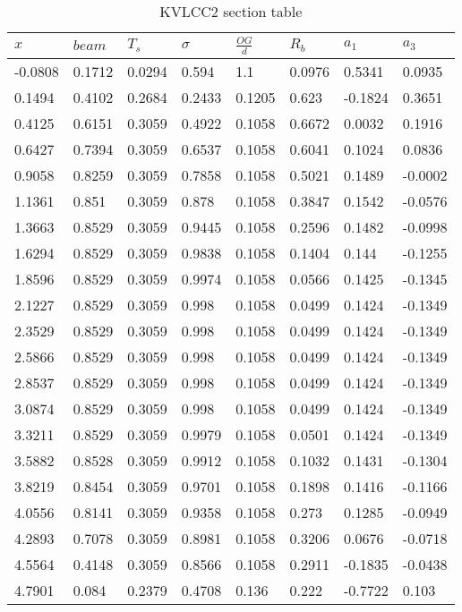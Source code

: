     
\begin{table}[H]
\small
\center
\caption{KVLCC2 section table}
\label{tab:kvlcc2_section_table}
\begin{tabular}{llllllll}
\toprule\addlinespace$x$ & $beam$ & $T_s$ & $\sigma$ & $\frac{OG}{d}$ & $R_b$ & $a_1$ & $a_3$\\ 
\midrule-0.0808 & 0.1712 & 0.0294 & 0.594 & 1.1 & 0.0976 & 0.5341 & 0.0935\\ 
0.1494 & 0.4102 & 0.2684 & 0.2433 & 0.1205 & 0.623 & -0.1824 & 0.3651\\ 
0.4125 & 0.6151 & 0.3059 & 0.4922 & 0.1058 & 0.6672 & 0.0032 & 0.1916\\ 
0.6427 & 0.7394 & 0.3059 & 0.6537 & 0.1058 & 0.6041 & 0.1024 & 0.0836\\ 
0.9058 & 0.8259 & 0.3059 & 0.7858 & 0.1058 & 0.5021 & 0.1489 & -0.0002\\ 
1.1361 & 0.851 & 0.3059 & 0.878 & 0.1058 & 0.3847 & 0.1542 & -0.0576\\ 
1.3663 & 0.8529 & 0.3059 & 0.9445 & 0.1058 & 0.2596 & 0.1482 & -0.0998\\ 
1.6294 & 0.8529 & 0.3059 & 0.9838 & 0.1058 & 0.1404 & 0.144 & -0.1255\\ 
1.8596 & 0.8529 & 0.3059 & 0.9974 & 0.1058 & 0.0566 & 0.1425 & -0.1345\\ 
2.1227 & 0.8529 & 0.3059 & 0.998 & 0.1058 & 0.0499 & 0.1424 & -0.1349\\ 
2.3529 & 0.8529 & 0.3059 & 0.998 & 0.1058 & 0.0499 & 0.1424 & -0.1349\\ 
2.5866 & 0.8529 & 0.3059 & 0.998 & 0.1058 & 0.0499 & 0.1424 & -0.1349\\ 
2.8537 & 0.8529 & 0.3059 & 0.998 & 0.1058 & 0.0499 & 0.1424 & -0.1349\\ 
3.0874 & 0.8529 & 0.3059 & 0.998 & 0.1058 & 0.0499 & 0.1424 & -0.1349\\ 
3.3211 & 0.8529 & 0.3059 & 0.9979 & 0.1058 & 0.0501 & 0.1424 & -0.1349\\ 
3.5882 & 0.8528 & 0.3059 & 0.9912 & 0.1058 & 0.1032 & 0.1431 & -0.1304\\ 
3.8219 & 0.8454 & 0.3059 & 0.9701 & 0.1058 & 0.1898 & 0.1416 & -0.1166\\ 
4.0556 & 0.8141 & 0.3059 & 0.9358 & 0.1058 & 0.273 & 0.1285 & -0.0949\\ 
4.2893 & 0.7078 & 0.3059 & 0.8981 & 0.1058 & 0.3206 & 0.0676 & -0.0718\\ 
4.5564 & 0.4148 & 0.3059 & 0.8566 & 0.1058 & 0.2911 & -0.1835 & -0.0438\\ 
4.7901 & 0.084 & 0.2379 & 0.4708 & 0.136 & 0.222 & -0.7722 & 0.103\\ 

\bottomrule
\end{tabular}
\end{table}

